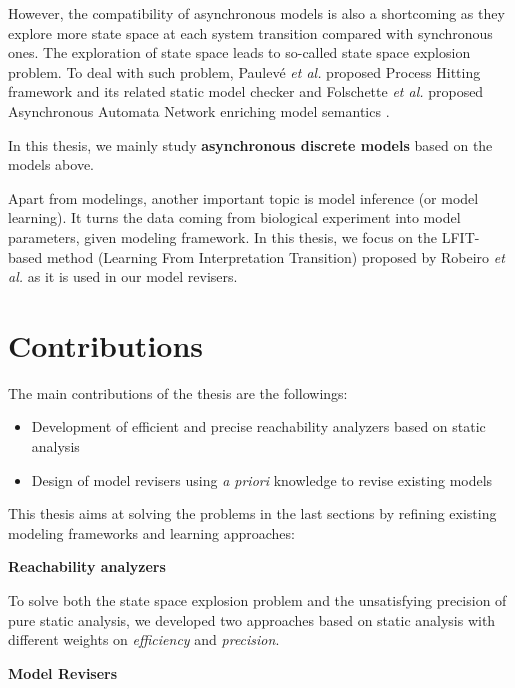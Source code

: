 However, the compatibility of asynchronous models is also a shortcoming as they explore more state space at each system transition compared with synchronous ones.
The exploration of state space leads to so-called state space explosion problem.
To deal with such problem, Paulev\'e \textit{et al.} proposed Process Hitting framework and its related static model checker \cite{pauleve2012} and Folschette \textit{et al.} proposed Asynchronous Automata Network enriching model semantics \cite{folschette2015}.

In this thesis, we mainly study \textbf{asynchronous discrete models} based on the models above.

Apart from modelings, another important topic is model inference (or model learning).
It turns the data coming from biological experiment into model parameters, given modeling framework.
In this thesis, we focus on the LFIT-based method (Learning From Interpretation Transition) proposed by Robeiro \textit{et al.} \cite{ribeiro2015learning,ribeiro2018learning,ribeiro2017inductive} as it is used in our model revisers.


\section{Contributions}\label{sec:contribution}
The main contributions of the thesis are the followings:
\begin{itemize}
    \item Development of efficient and precise reachability analyzers based on static analysis
    \item Design of model revisers using \textit{a priori} knowledge to revise existing models
\end{itemize}

This thesis aims at solving the problems in the last sections by refining existing modeling frameworks and learning approaches:

\textbf{Reachability analyzers}

To solve both the state space explosion problem and the unsatisfying precision of pure static analysis, we developed two approaches based on static analysis with different weights on \textit{efficiency} and \textit{precision}.


\textbf{Model Revisers}

